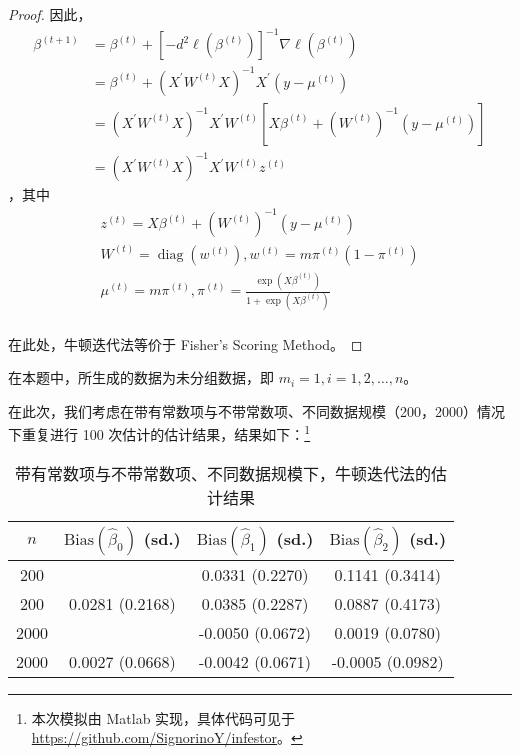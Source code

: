 \documentclass[cn,mtpro2,12pt]{elegantpaper}
\begin{document}
\begin{proof}
    因此，
    \begin{equation*}
        \begin{aligned}
            \beta^{(t+1)} & =\beta^{(t)}+\left[-d^{2}\ell\left(\beta^{(t)}\right)\right]^{-1}\nabla\ell\left(\beta^{(t)}\right)                              \\
                          & =\beta^{(t)}+\left(X^\prime W^{(t)} X\right)^{-1}X^\prime\left(y-\mu^{(t)}\right)                                                \\
                          & =\left(X^\prime W^{(t)} X\right)^{-1}X^\prime W^{(t)}\left[X\beta^{(t)}+\left(W^{(t)}\right)^{-1}\left(y-\mu^{(t)}\right)\right] \\
                          & =\left(X^\prime W^{(t)}X\right)^{-1}X^\prime W^{(t)}z^{(t)}
        \end{aligned}
    \end{equation*}
    ，其中
    \begin{gather*}
        z^{(t)}=X\beta^{(t)}+\left(W^{(t)}\right)^{-1}\left(y-\mu^{(t)}\right)\\
        W^{(t)}=\operatorname{diag}\left(w^{(t)}\right),w^{(t)}=m\pi^{(t)}\left(1-\pi^{(t)}\right)\\
        \mu^{(t)}=m\pi^{(t)},\pi^{(t)}=\frac{\exp\left(X\beta^{(t)}\right)}{1+\exp\left(X\beta^{(t)}\right)}\\
    \end{gather*}

    在此处，牛顿迭代法等价于 Fisher's Scoring Method。
\end{proof}

在本题中，所生成的数据为未分组数据，即 $m_{i}=1,i=1,2,\ldots,n$。

在此次，我们考虑在带有常数项与不带常数项、不同数据规模（200，2000）情况下重复进行 100 次估计的估计结果，结果如下：\footnote{本次模拟由 Matlab 实现，具体代码可见于 \href{https://github.com/SignorinoY/infestor}{https://github.com/SignorinoY/infestor}。}

\begin{table}[htp]
    \centering
    \caption{带有常数项与不带常数项、不同数据规模下，牛顿迭代法的估计结果}
    \begin{tabular}{cccc}
        \toprule
        $n$  & $\text{Bias}(\hat{\beta}_{0})$ (sd.) & $\text{Bias}(\hat{\beta}_{1})$ (sd.) & $\text{Bias}(\hat{\beta}_{2})$ (sd.) \\
        \midrule
        200  &                                      & 0.0331 (0.2270)                      & 0.1141 (0.3414)                      \\
        200  & 0.0281 (0.2168)                      & 0.0385 (0.2287)                      & 0.0887 (0.4173)                      \\
        2000 &                                      & -0.0050 (0.0672)                     & 0.0019 (0.0780)                      \\
        2000 & 0.0027 (0.0668)                      & -0.0042 (0.0671)                     & -0.0005 (0.0982)                     \\
        \bottomrule
    \end{tabular}
\end{table}
\end{document}
